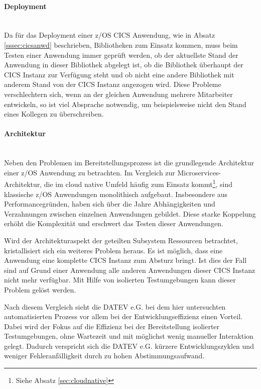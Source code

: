 \paragraph{Deployment}~\\
Da für das Deployment einer z/OS CICS Anwendung, wie in Absatz \ref{sssec:cicsanwd} beschrieben, Bibliotheken zum Einsatz kommen, muss beim Testen einer Anwendung immer geprüft werden, ob der aktuellste Stand der Anwendung in dieser Bibliothek abgelegt ist, ob die Bibliothek überhaupt der CICS Instanz zur Verfügung steht und ob nicht eine andere Bibliothek mit anderem Stand von der CICS Instanz angezogen wird.
Diese Probleme verschlechtern sich, wenn an der gleichen Anwendung mehrere Mitarbeiter entwickeln, so ist viel Absprache notwendig, um beispielsweise nicht den Stand eines Kollegen zu überschreiben.

\paragraph{Architektur}~\\
Neben den Problemen im Bereitstellungsprozess ist die grundlegende Architektur einer z/OS Anwendung zu betrachten.
Im Vergleich zur \glqq Microservices\grqq-Architektur, die im cloud native Umfeld häufig zum Einsatz kommt\footnote{Siehe Absatz \ref{sec:cloudnative}}, sind klassische z/OS Anwendungen monolithisch aufgebaut.
Insbesondere aus Performancegründen, haben sich über die Jahre Abhängigkeiten und Verzahnungen zwischen einzelnen Anwendungen gebildet.
Diese starke Koppelung erhöht die Komplexität und erschwert das Testen dieser Anwendungen.

Wird der Architekturaspekt der geteilten Subsystem Ressourcen betrachtet, kristallisiert sich ein weiteres Problem heraus.
Es ist möglich, dass eine Anwendung eine komplette CICS Instanz zum Absturz bringt.
Ist dies der Fall sind auf Grund einer Anwendung alle anderen Anwendungen dieser CICS Instanz nicht mehr verfügbar.
Mit Hilfe von isolierten Testumgebungen kann dieser Problem gelöst werden.

Nach diesem Vergleich sieht die DATEV e.G. bei dem hier untersuchten automatisierten Prozess vor allem bei der Entwicklungseffizienz einen Vorteil.
Dabei wird der Fokus auf die Effizienz bei der Bereitstellung isolierter Testumgebungen, ohne Wartezeit und mit möglichst wenig manueller Interaktion gelegt.
Dadurch verspricht sich die DATEV e.G. kürzere Entwicklungszyklen und weniger Fehleranfälligkeit durch zu hohen Abstimmungsaufwand.


